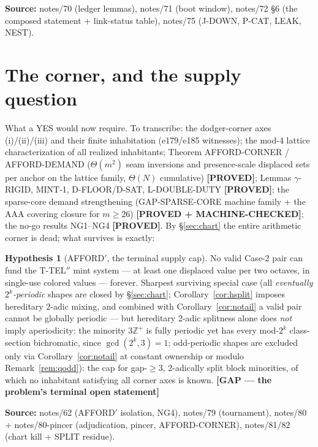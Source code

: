 \documentclass[11pt]{article}
\theoremstyle{definition}
\newtheorem{hypothesis}[theorem]{Hypothesis}
\newcommand{\Z}{\mathbb{Z}}
\newcommand{\source}[1]{\par\smallskip\noindent\textbf{Source:} {#1}\par}
\newcommand{\status}[1]{\textbf{[#1]}}
\begin{document}
\source{notes/70 (ledger lemmas), notes/71 (boot window), notes/72 \S6 (the
composed statement + link-status table), notes/75 (J-DOWN, P-CAT, LEAK,
NEST).}

\section{The corner, and the supply question}\label{sec:supply}

What a YES would now require.  To transcribe: the dodger-corner axes
(i)/(ii)/(iii) and their finite inhabitation (e179/e185 witnesses); the
mod-4 lattice characterization of all realized inhabitants; Theorem
AFFORD-CORNER / AFFORD-DEMAND ($\Theta(m^2)$ seam inversions and
presence-scale displaced sets per anchor on the lattice family,
$\Theta(N)$ cumulative) \status{PROVED}; Lemmas $\gamma$-RIGID, MINT-1,
D-FLOOR/D-SAT, L-DOUBLE-DUTY \status{PROVED}; the sparse-core demand
strengthening (GAP-SPARSE-CORE machine family + the AAA covering closure
for $m \ge 26$) \status{PROVED + MACHINE-CHECKED}; the no-go results
NG1--NG4 \status{PROVED}.  By \S\ref{sec:chart} the entire arithmetic
corner is dead; what survives is exactly:

\begin{hypothesis}[AFFORD$'$, the terminal supply cap]\label{hyp:afford}
No valid Case-2 pair can fund the T-TEL$''$ mint system --- at least one
displaced value per two octaves, in single-use colored values --- forever.
Sharpest surviving special case (all \emph{eventually $2^k$-periodic}
shapes are closed by \S\ref{sec:chart}; Corollary~\ref{cor:hsplit}
imposes hereditary 2-adic mixing, and combined with
Corollary~\ref{cor:notail} a valid pair cannot be globally periodic ---
but hereditary 2-adic splitness alone does
\emph{not} imply aperiodicity: the minority $3\Z^+$ is fully periodic yet
has every mod-$2^k$ class-section bichromatic, since $\gcd(2^k,3)=1$;
odd-periodic shapes are excluded only via Corollary~\ref{cor:notail} at
constant ownership or modulo Remark~\ref{rem:qodd}): the cap for
gap-$\ge 3$, 2-adically split block minorities, of which no inhabitant
satisfying all corner axes is known.  \status{GAP --- the problem's
terminal open statement}
\end{hypothesis}

\source{notes/62 (AFFORD$'$ isolation, NG4), notes/79 (tournament),
notes/80 + notes/80-pincer (adjudication, pincer, AFFORD-CORNER),
notes/81/82 (chart kill + SPLIT residue).}
\end{document}
